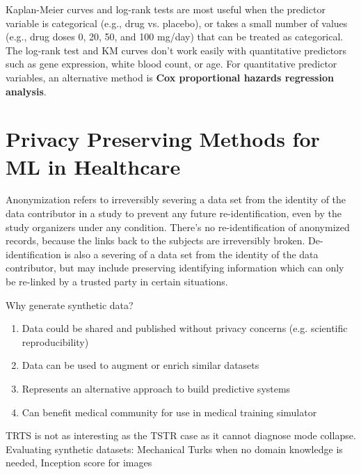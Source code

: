 \documentclass[11pt]{article}
\newcommand{\ulb}{\begin{enumerate}[label=\textbullet,topsep=0pt,itemsep=-0.5ex,partopsep=1ex,parsep=1ex]}
\newcommand{\ule}{\end{enumerate}\vspace{1mm}}
\begin{document}
\par Kaplan-Meier curves and log-rank tests are most useful when the predictor variable is categorical (e.g., drug vs. placebo), or takes a small number of values (e.g., drug doses 0, 20, 50, and 100 mg/day) that can be treated as categorical. The log-rank test and KM curves don't work easily with quantitative predictors such as gene expression, white blood count, or age. For quantitative predictor variables, an alternative method is \textbf{Cox proportional hazards regression analysis}.

\section{Privacy Preserving Methods for ML in Healthcare}
\par Anonymization refers to irreversibly severing a data set from the identity of the data contributor in a study to prevent any future re-identification, even by the study organizers under any condition. There's no re-identification of anonymized records, because the links back to the subjects are irreversibly broken. De-identification is also a severing of a data set from the identity of the data contributor, but may include preserving identifying information which can only be re-linked by a trusted party in certain situations.
\par Why generate synthetic data?
\ulb
\item Data could be shared and published without privacy concerns (e.g. scientific reproducibility)
\item Data can be used to augment or enrich similar datasets
\item Represents an alternative approach to build predictive systems
\item Can benefit medical community for use in medical training simulator
\ule
TRTS is not as interesting as the TSTR case as it cannot diagnose mode collapse. Evaluating synthetic datasets: Mechanical Turks when no domain knowledge is needed, Inception score for images
\end{document}
